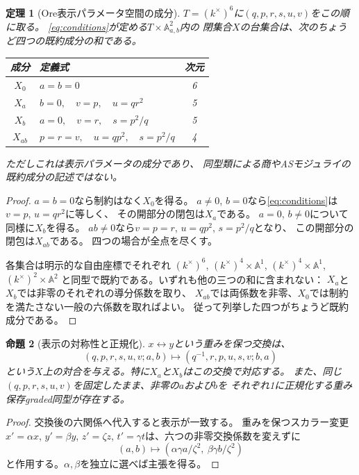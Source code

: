 \documentclass[11pt,a4paper]{ltjsarticle}
\newtheorem{theorem}{定理}[section]
\newtheorem{proposition}[theorem]{命題}
\theoremstyle{definition}
\begin{document}
\begin{theorem}[Ore表示パラメータ空間の成分]\label{thm:components}
$T=(k^\times)^6$に$(q,p,r,s,u,v)$をこの順に取る。
\eqref{eq:conditions}が定める$T\times\mathbb A^2_{a,b}$内の
閉集合$X$の台集合は、次の\emph{ちょうど四つ}の既約成分の和である。
\begin{center}
\begin{tabular}{c|p{.59\linewidth}|c}
\toprule
成分 & 定義式 & 次元\\
\midrule
$X_0$ & $a=b=0$ & 6\\
$X_a$ & $b=0,\quad v=p,\quad u=qr^2$ & 5\\
$X_b$ & $a=0,\quad v=r,\quad s=p^2/q$ & 5\\
$X_{ab}$ & $p=r=v,\quad u=qp^2,\quad s=p^2/q$ & 4\\
\bottomrule
\end{tabular}
\end{center}
ただしこれは\emph{表示パラメータ}の成分であり、
同型類による商やASモジュライの既約成分の記述ではない。
\end{theorem}
\begin{proof}
$a=b=0$なら制約はなく$X_0$を得る。
$a\ne0$, $b=0$なら\eqref{eq:conditions}は$v=p$, $u=qr^2$に等しく、
その開部分の閉包は$X_a$である。
$a=0$, $b\ne0$について同様に$X_b$を得る。
$a b\ne0$なら$v=p=r$, $u=qp^2$, $s=p^2/q$となり、
この開部分の閉包は$X_{ab}$である。
四つの場合が全点を尽くす。

各集合は明示的な自由座標でそれぞれ
$(k^\times)^6$, $(k^\times)^4\times\mathbb A^1$,
$(k^\times)^4\times\mathbb A^1$,
$(k^\times)^2\times\mathbb A^2$
と同型で既約である。いずれも他の三つの和に含まれない：
$X_a$と$X_b$では非零のそれぞれの導分係数を取り、
$X_{ab}$では両係数を非零、$X_0$では制約を満たさない一般の六係数を取ればよい。
従って列挙した四つがちょうど既約成分である。
\end{proof}

\begin{proposition}[表示の対称性と正規化]\label{prop:normalization}
$x\leftrightarrow y$という重みを保つ交換は、
\[
(q,p,r,s,u,v;a,b)\longmapsto
(q^{-1},r,p,u,s,v;b,a)
\]
という$X$上の対合を与える。特に$X_a$と$X_b$はこの交換で対応する。
また、同じ$(q,p,r,s,u,v)$を固定したまま、非零の$a$および$b$を
それぞれ1に正規化する重み保存graded同型が存在する。
\end{proposition}
\begin{proof}
交換後の六関係へ代入すると表示が一致する。
重みを保つスカラー変更$x'=\alpha x$, $y'=\beta y$,
$z'=\zeta z$, $t'=\gamma t$は、六つの非零交換係数を変えずに
\[
(a,b)\longmapsto
(\alpha\gamma a/\zeta^2,\ \beta\gamma b/\zeta^2)
\]
と作用する。$\alpha,\beta$を独立に選べば主張を得る。
\end{proof}
\end{document}
